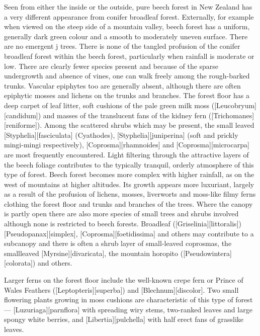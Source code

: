 Seen from either the inside or the outside, pure beech forest in New Zealand has a very different appearance from conifer broadleaf forest.
Externally, for example when viewed on the steep side of a mountain valley, beech forest has a uniform, generally dark green colour and a smooth to moderately uneven surface.
There are no emergent j trees.
There is none of the tangled profusion of the conifer broadleaf forest within the beech forest, particularly when rainfall is moderate or low.
There are clearly fewer species present and because of the sparse undergrowth and absence of vines, one can walk freely among the rough-barked trunks.
Vascular epiphytes too are generally absent, although there are often epiphytic mosses and lichens on the trunks and branches.
The forest floor has a deep carpet of leaf litter, soft cushions of the pale green milk moss ([Leucobryum][candidum]) and masses of the translucent fans of the kidney fern ([Trichomanes][reniforme]).
Among the scattered shrubs which may be present, the small leaved [Styphelia][fasciculata] (Cyathodes), [Styphelia][juniperina] (soft and prickly mingi-mingi respectively), [Coprosma][rhamnoides] and [Coprosma][microcarpa] are most frequently encountered.
Light filtering through the attractive layers of the beech foliage contributes to the typically tranquil, orderly atmosphere of this type of forest.
Beech forest becomes more complex with higher rainfall, as on the west of mountains at higher altitudes.
Its growth appears more luxuriant, largely as a result of the profusion of lichens, mosses, liverworts and moss-like filmy ferns clothing the forest floor and trunks and branches of the trees.
Where the canopy is partly open there are also more species of small trees and shrubs involved although none is restricted to beech forests.
Broadleaf ([Griselinia][littoralis])[Pseudopanax][simplex],  [Coprosma][foetidissima] and others may contribute to a subcanopy and there is often a shrub layer of small-leaved coprosmas, the smallleaved [Myrsine][divaricata], the mountain horopito ([Pseudowintera][colorata]) and others.

Larger ferns on the forest floor include the well-known crepe fern or Prince of Wales Feathers ([Leptopteris][superba]) and [Blechnum][discolor].
Two small flowering plants growing in moss cushions are characteristic of this type of forest --- [Luzuriaga][parnflora] with spreading wiry stems, two-ranked leaves and large spongy white berries, and [Libertia][pulchella] with half erect fans of grasslike leaves.

